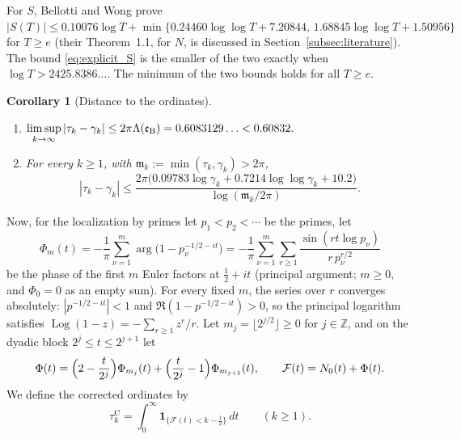 \documentclass[11pt,a4paper]{article}
\makeatletter
\numberwithin{equation}{section}
\DeclareRobustCommand{\CGref}[1]{\ref{#1}}
\DeclareRobustCommand{\CGeqref}[1]{\eqref{#1}}
\DeclareRobustCommand{\CGcite}[2][]{\if\relax\detokenize{#1}\relax\cite{#2}\else\cite[#1]{#2}\fi}
\let\CG@origref\ref
\let\CG@origeqref\eqref
\newcommand{\CG@gettip}[1]{\@ifundefined{CGTip@#1}{#1}{\csname CGTip@#1\endcsname}}
\newcommand{\CG@getbib}[1]{\@ifundefined{CGBib@#1}{#1}{\csname CGBib@#1\endcsname}}
\DeclareRobustCommand{\CGref}[1]{\pdftooltip{\CG@origref{#1}}{\CG@gettip{#1}}}
\DeclareRobustCommand{\CGeqref}[1]{\pdftooltip{\CG@origeqref{#1}}{\CG@gettip{#1}}}
\DeclareRobustCommand{\CGcite}[2][]{\pdftooltip{\if\relax\detokenize{#1}\relax\cite{#2}\else\cite[#1]{#2}\fi}{\CG@getbib{#2}}}
\newtheorem{corollary}[theorem]{Corollary}
\theoremstyle{definition}
\theoremstyle{remark}
\newcommand{\Nz}{N_0} %
\newcommand{\Fc}{\mathcal F}
\newcommand{\Ph}{\Phi}
\newcommand{\Ind}{\mathbf 1}
\newcommand{\eB}{\mathfrak e_{\rm B}}
\newcommand{\Z}{\mathbb Z}
\makeatother
\begin{document}
\par
For $S$, Bellotti and Wong \CGcite[Cor.~1.5]{BellottiWong2025} prove $|S(T)|\le0.10076\log T+\min\{0.24460\log\log T+7.20844,\,1.68845\log\log T+1.50956\}$ for $T\ge e$ (their Theorem~1.1, for $N$, is discussed in Section~\CGref{subsec:literature}). The bound \CGeqref{eq:explicit_S} is the smaller of the two exactly when $\log T>2425.8386\ldots$. The minimum of the two bounds holds for all $T\ge e$.

\begin{corollary}[Distance to the ordinates]\label{cor:clock}
\begin{enumerate}[label=(\alph*)]
\item $\displaystyle\limsup_{k\to\infty}|\tau_k-\gamma_k|\le2\pi\Lambda(\eB)=0.6083129\ldots<0.60832 .$
\item For every $k\ge1$, with $\mathfrak m_k:=\min(\tau_k,\gamma_k)>2\pi$,
\begin{equation}
|\tau_k-\gamma_k|\le\frac{2\pi\bigl(0.09783\log\gamma_k+0.7214\log\log\gamma_k+10.2\bigr)}{\log(\mathfrak m_k/2\pi)} .
\label{eq:clock_explicit}
\end{equation}
\end{enumerate}
\end{corollary}

Now, for the localization by primes let $p_1<p_2<\cdots$ be the primes, let
\begin{equation}
\Ph_m(t)=-\frac1\pi\sum_{\nu=1}^m\arg\bigl(1-p_\nu^{-1/2-it}\bigr)=-\frac1\pi\sum_{\nu=1}^m\sum_{r\ge1}\frac{\sin(rt\log p_\nu)}{r\,p_\nu^{r/2}}
\label{eq:Euler_phase}
\end{equation}
be the phase of the first $m$ Euler factors at $\frac12+it$ (principal argument; $m\ge0$, and $\Ph_0=0$ as an empty sum). For every fixed $m$, the series over $r$ converges absolutely: $|p^{-1/2-it}|<1$ and $\Re(1-p^{-1/2-it})>0$, so the principal logarithm satisfies $\operatorname{Log}(1-z)=-\sum_{r\ge1}z^r/r$. Let $m_j=\lfloor2^{j/2}\rfloor\ge0$ for $j\in\Z$, and on the dyadic block $2^j\le t\le2^{j+1}$ let
\begin{equation}
\Ph(t)=\Bigl(2-\frac t{2^j}\Bigr)\Ph_{m_j}(t)+\Bigl(\frac t{2^j}-1\Bigr)\Ph_{m_{j+1}}(t),\qquad \Fc(t)=\Nz(t)+\Ph(t).
\label{eq:F_def}
\end{equation}
We define the corrected ordinates by
\begin{equation}
\tau_{k}^{\mathrm C}=\int_0^\infty\Ind_{\{\Fc(t)<k-\frac12\}}\,dt\qquad(k\ge1).
\label{eq:xk_def}
\end{equation}
\end{document}
